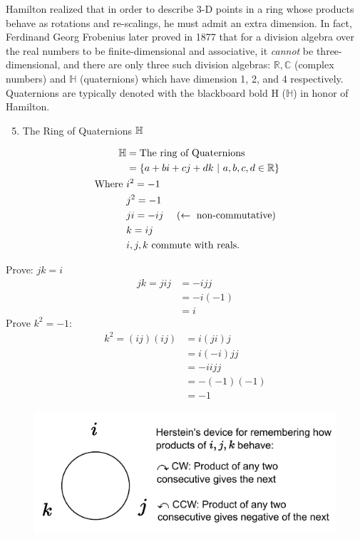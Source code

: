 Hamilton realized that in order to describe 3-D points in a ring whose products behave as rotations and re-scalings, he must admit an extra dimension. In fact, Ferdinand Georg Frobenius later proved in 1877 that for a division algebra over the real numbers to be finite-dimensional and associative, it \textit{cannot} be three-dimensional, and there are only three such division algebras: 
$\mathbb{R,C}$ (complex numbers) and $\mathbb{H}$ (quaternions) which have dimension 1, 2, and 4 respectively. Quaternions are typically denoted with the blackboard bold H ($\mathbb{H}$) in honor of Hamilton.
\begin{enumerate}\setcounter{enumi}{4}
    \item The Ring of Quaternions $\H$
\end{enumerate}
\begin{definition}[Quaternions $\H$]
\begin{align}
    \mathbb{H} &= \text{The ring of Quaternions} \nonumber \\
    &= \{a+bi+cj+dk \ | \ a,b,c,d \in {\mathbb{ R}} \} \nonumber \\
    \text{ Where } &i^2=-1 \nonumber \\
    &j^2=-1 \nonumber \\
    &ji=-ij  \ \ \ \ (\leftarrow \text{ non-commutative})\nonumber \\
    &k=ij \nonumber \\
    &i,j,k \text{ commute with reals.}\nonumber
\end{align}
\end{definition}
Prove: $jk=i$
\begin{align}
    jk=jij&=-ijj \nonumber \\
    &= -i(-1) \nonumber \\
    &= i \nonumber
\end{align}
Prove $k^2=-1$:
\begin{align}
    k^2 = (ij)(ij) &= i(ji)j \nonumber \\
    &= i(-i)jj \nonumber \\
    &= -iijj \nonumber \\
    &= -(-1)(-1) \nonumber \\
    &= -1 \nonumber
\end{align}
\begin{figure}
    \centering
    \includegraphics{Figures/Herstein_quat_device.pdf}
    \label{fig:herstein_quat_device}
\end{figure}
